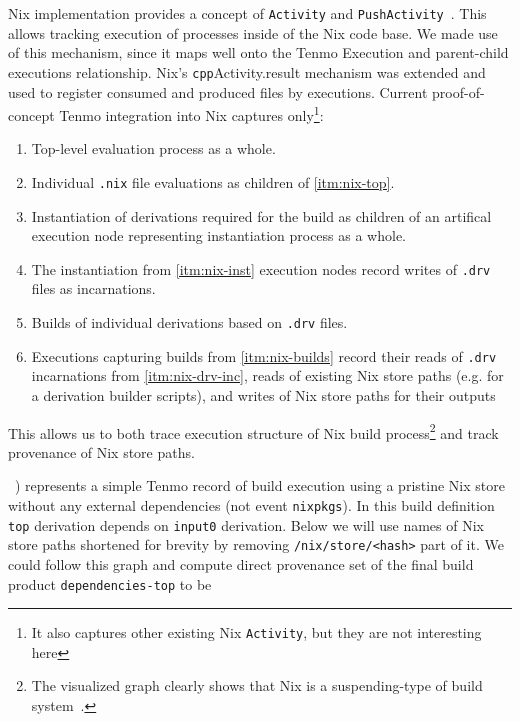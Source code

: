 Nix implementation provides a concept of \texttt{Activity} and \texttt{PushActivity}~\cite{nixloggi85:online}. This allows tracking execution of processes inside of the Nix code base. We made use of this mechanism, since it maps well onto the Tenmo Execution and parent-child executions relationship. Nix's \texttt{cpp}{Activity.result} mechanism was extended and used to register consumed and produced files by executions. Current proof-of-concept Tenmo integration into Nix captures only\footnote{It also captures other existing Nix \texttt{Activity}, but they are not interesting here}:
%
\begin{enumerate}[nosep]
    \item \label{itm:nix-top} Top-level evaluation process as a whole.
    \item Individual \texttt{.nix} file evaluations as children of \cref{itm:nix-top}.
    \item \label{itm:nix-inst} Instantiation of derivations required for the build as children of an artifical execution node representing instantiation process as a whole.
    \item \label{itm:nix-drv-inc} The instantiation from \cref{itm:nix-inst} execution nodes record writes of \texttt{.drv} files as incarnations.
    \item \label{itm:nix-builds} Builds of individual derivations based on \texttt{.drv} files.
    \item Executions capturing builds from \cref{itm:nix-builds} record their reads of \texttt{.drv} incarnations from \cref{itm:nix-drv-inc}, reads of existing Nix store paths (e.g. for a derivation builder scripts), and writes of Nix store paths for their outputs 
\end{enumerate}

This allows us to both trace execution structure of Nix build process\footnote{The visualized graph clearly shows that Nix is a suspending-type of build system~\cite{Mokhov2020}.} and track provenance of Nix store paths.

~) represents a simple Tenmo record of build execution using a pristine Nix store without any external dependencies (not event \texttt{nixpkgs}). In this build definition \texttt{top} derivation depends on \texttt{input0} derivation. Below we will use names of Nix store paths shortened for brevity by removing \texttt{/nix/store/<hash>} part of it. We could follow this graph and compute direct provenance set of the final build product \texttt{dependencies-top} to be 

